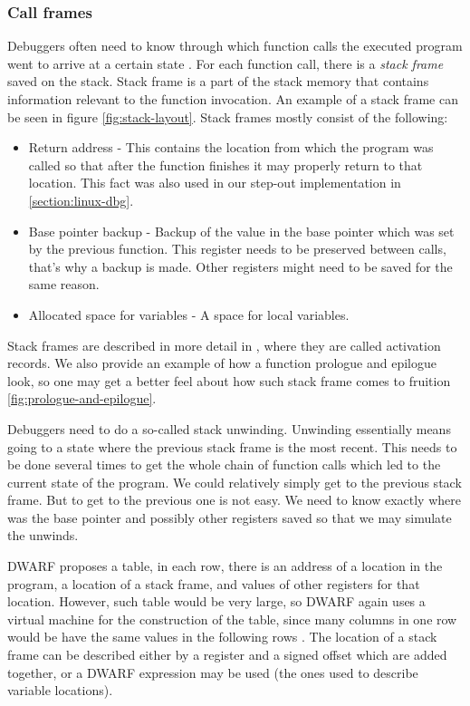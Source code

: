 \subsubsection{Call frames}
Debuggers often need to know through which function calls the executed program
went to arrive at a certain state \cite{dwarf}. For each function call, there
is a \textit{stack frame} saved on the stack. Stack frame is a part of the stack memory that
contains information relevant to the function invocation. An example of a
stack frame can be seen in figure \ref{fig:stack-layout}.
Stack frames mostly consist of the following:
\begin{itemize}
    \item Return address - This contains the location from which the program
        was called so that after the function finishes it may properly return
        to that location. This fact was also used in our step-out
        implementation in \ref{section:linux-dbg}.
    \item Base pointer backup - Backup of the value in the base pointer which
        was set by the previous function. This register needs to be preserved
        between calls, that's why a backup is made. Other registers might need
        to be saved for the same reason.
    \item Allocated space for variables - A space for local variables.
\end{itemize}
Stack frames are described in more detail in \cite{dragon-book}, where they are
called activation records. We also provide an example of how a function
prologue and epilogue look, so one may get a better feel about how such stack
frame comes to fruition \ref{fig:prologue-and-epilogue}.

Debuggers need to do a so-called stack unwinding. Unwinding essentially means
going to a state where the previous stack frame is the most recent. This needs
to be done several times to get the whole chain of function calls which led to
the current state of the program. We could relatively simply get to the
previous stack frame. But to get to the previous one is not easy. We need to
know exactly where was the base pointer and possibly other registers saved so
that we may simulate the unwinds.

DWARF proposes a table, in each row, there is an address of a location in the
program, a location of a stack frame, and values of other registers for that
location. However, such table would be very large, so DWARF again uses a
virtual machine for the construction of the table, since many columns in one
row would be have the same values in the following rows \cite{dwarf}. The
location of a stack frame can be described either by a register and a signed
offset which are added together, or a DWARF expression may be used (the ones
used to describe variable locations).

